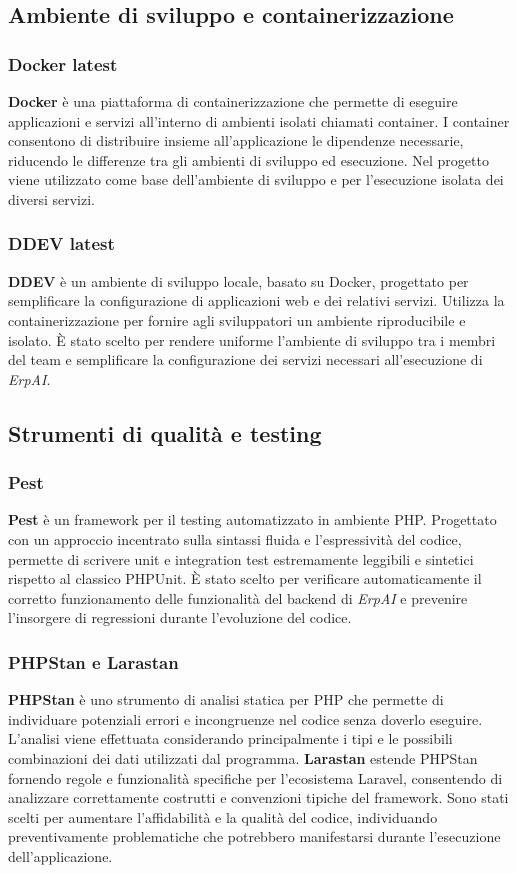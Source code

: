 \subsection{Ambiente di sviluppo e containerizzazione}

\subsubsection{Docker latest}
\textbf{Docker} è una piattaforma di containerizzazione che permette di eseguire applicazioni e servizi all'interno di ambienti isolati chiamati container. I container consentono 
di distribuire insieme all'applicazione le dipendenze necessarie, riducendo le differenze tra gli ambienti di sviluppo ed esecuzione. Nel progetto viene utilizzato come base 
dell'ambiente di sviluppo e per l'esecuzione isolata dei diversi servizi.

\subsubsection{DDEV latest}
\textbf{DDEV} è un ambiente di sviluppo locale, basato su Docker, progettato per semplificare la configurazione di applicazioni web e dei relativi servizi. Utilizza la 
containerizzazione per fornire agli sviluppatori un ambiente riproducibile e isolato. È stato scelto per rendere uniforme l'ambiente di sviluppo tra i membri del team e 
semplificare la configurazione dei servizi necessari all'esecuzione di \textit{ErpAI}.

\subsection{Strumenti di qualità e testing}
\subsubsection{Pest}
\textbf{Pest} è un framework per il testing automatizzato in ambiente PHP. Progettato con un approccio incentrato sulla sintassi fluida e l'espressività del codice, 
permette di scrivere unit e integration test estremamente leggibili e sintetici rispetto al classico PHPUnit. È stato scelto per verificare automaticamente il corretto 
funzionamento delle funzionalità del backend di \textit{ErpAI} e prevenire l'insorgere di regressioni durante l'evoluzione del codice.

\subsubsection{PHPStan e Larastan}
\textbf{PHPStan} è uno strumento di analisi statica per PHP che permette di individuare potenziali errori e incongruenze nel codice senza doverlo eseguire. L'analisi viene 
effettuata considerando principalmente i tipi e le possibili combinazioni dei dati utilizzati dal programma. \textbf{Larastan} estende PHPStan fornendo regole e funzionalità 
specifiche per l'ecosistema Laravel, consentendo di analizzare correttamente costrutti e convenzioni tipiche del framework. Sono stati scelti per aumentare l'affidabilità e 
la qualità del codice, individuando preventivamente problematiche che potrebbero manifestarsi durante l'esecuzione dell'applicazione.


